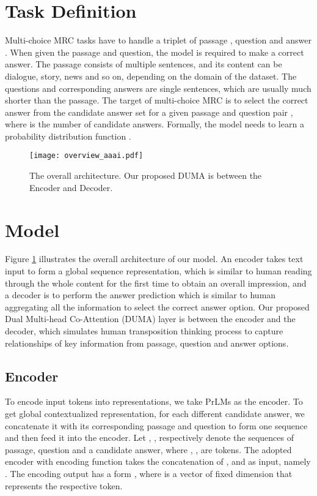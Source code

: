 \documentclass[letterpaper]{article} \usepackage{aaai21}  \usepackage{times}  \usepackage{helvet} \usepackage{courier}  \usepackage[hyphens]{url}  \usepackage{graphicx} \urlstyle{rm} \def\UrlFont{\rm}  \usepackage{natbib}  \usepackage{caption} \frenchspacing  \setlength{\pdfpagewidth}{8.5in}  \setlength{\pdfpageheight}{11in}
\begin{document}
\section{Task Definition}
Multi-choice MRC tasks have to handle a triplet of passage , question  and answer . When given the passage and question, the model is required to make a correct answer. The passage consists of multiple sentences, and its content can be dialogue, story, news and so on, depending on the domain of the dataset. The questions and corresponding answers are single sentences, which are usually much shorter than the passage. The target of multi-choice MRC is to select the correct answer from the candidate answer set  for a given passage and question pair , where  is the number of candidate answers. Formally, the model needs to learn a probability distribution function .

\begin{figure}[!htb]
	\centering
	\texttt{[image: overview\_aaai.pdf]}
	\caption{The overall architecture. Our proposed DUMA is between the Encoder and Decoder.}
	\label{fig:overview}
\end{figure}

\section{Model}
\label{sec_model}

Figure \ref{fig:overview} illustrates the overall architecture of our model. An encoder takes text input to form a global sequence representation, which is similar to human reading through the whole content for the first time to obtain an overall impression, and a decoder is to perform the answer prediction which is similar to human aggregating all the information to select the correct answer option. Our proposed Dual Multi-head Co-Attention (DUMA) layer is between the encoder and the decoder, which simulates human transposition thinking process to capture relationships of key information from passage, question and answer options.

\subsection{Encoder}
To encode input tokens into representations, we take PrLMs as the encoder. To get global contextualized representation, for each different candidate answer, we concatenate it with its corresponding passage and question to form one sequence and then feed it into the encoder. Let , ,  respectively denote the sequences of passage, question and a candidate answer, where , ,  are tokens. The adopted encoder with encoding function  takes the concatenation of ,  and  as input, namely . The encoding output  has a form , where  is a vector of fixed dimension  that represents the respective token.
\end{document}
